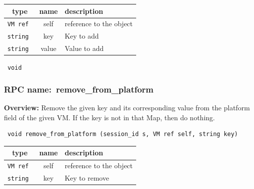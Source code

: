 
 
\vspace{0.3cm}
\begin{tabular}{|c|c|p{7cm}|}
 \hline
{\bf type} & {\bf name} & {\bf description} \\ \hline
{\tt VM ref } & self & reference to the object \\ \hline 

{\tt string } & key & Key to add \\ \hline 

{\tt string } & value & Value to add \\ \hline 

\end{tabular}

\vspace{0.3cm}

{\tt 
void
}



\vspace{0.3cm}
\vspace{0.3cm}
\vspace{0.3cm}
\subsubsection{RPC name:~remove\_from\_platform}

{\bf Overview:} 
Remove the given key and its corresponding value from the platform field of
the given VM.  If the key is not in that Map, then do nothing.

\begin{verbatim} void remove_from_platform (session_id s, VM ref self, string key)\end{verbatim}



 
\vspace{0.3cm}
\begin{tabular}{|c|c|p{7cm}|}
 \hline
{\bf type} & {\bf name} & {\bf description} \\ \hline
{\tt VM ref } & self & reference to the object \\ \hline 

{\tt string } & key & Key to remove \\ \hline 

\end{tabular}

\vspace{0.3cm}

